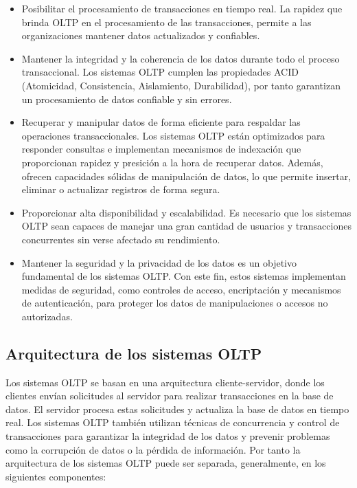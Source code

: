 \begin{itemize}
    \item Posibilitar el procesamiento de transacciones en tiempo real. La rapidez que brinda OLTP en el procesamiento de 
        las transacciones, permite a las organizaciones mantener datos actualizados y 
        confiables.

    \item Mantener la integridad y la coherencia de los datos durante todo el proceso transaccional. Los sistemas OLTP 
        cumplen las propiedades ACID (Atomicidad, Consistencia, Aislamiento, Durabilidad), por tanto garantizan un 
        procesamiento de datos confiable y sin errores.

    \item Recuperar y manipular datos de forma eficiente para respaldar las operaciones transaccionales. Los sistemas OLTP
        est\'an optimizados para responder consultas e implementan mecanismos de indexación que proporcionan rapidez y presici\'on 
        a la hora de recuperar datos. Adem\'as, ofrecen capacidades s\'olidas de manipulaci\'on de datos, lo que permite 
        insertar, eliminar o actualizar registros de forma segura.

    \item Proporcionar alta disponibilidad y escalabilidad. Es necesario que los sistemas OLTP sean capaces de manejar una 
        gran cantidad de usuarios y transacciones concurrentes sin verse afectado su rendimiento.

    \item Mantener la seguridad y la privacidad de los datos es un objetivo fundamental de los sistemas OLTP. Con este fin, 
        estos sistemas implementan medidas de seguridad, como controles de acceso, encriptación y mecanismos de autenticación, 
        para proteger los datos de manipulaciones o accesos no autorizadas.
\end{itemize}

\subsection{Arquitectura de los sistemas OLTP}

Los sistemas OLTP se basan en una arquitectura cliente-servidor, donde los clientes envían solicitudes al servidor para 
realizar transacciones en la base de datos. El servidor procesa estas solicitudes y actualiza la base de datos en tiempo 
real. Los sistemas OLTP también utilizan técnicas de concurrencia y control de transacciones para garantizar la integridad 
de los datos y prevenir problemas como la corrupción de datos o la pérdida de información. Por tanto la arquitectura de los 
sistemas OLTP puede ser separada, generalmente, en los siguientes componentes:

